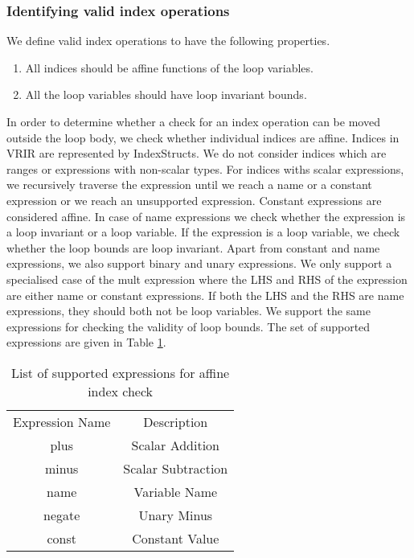 \subsubsection{Identifying valid index operations}
We define valid index operations to have the following properties. 
\begin{enumerate}
\item All indices should be affine functions of the loop variables. 
\item All the loop variables should have loop invariant bounds. 
\end{enumerate}
In order to determine whether a check for an index operation can be moved outside the loop body, we check whether individual indices are affine. Indices in VRIR are represented by IndexStructs. We do not consider indices which are ranges or expressions with non-scalar types. For indices withs scalar expressions, we recursively traverse the expression until we reach a name or a constant expression or we reach an unsupported expression. Constant expressions are considered affine. In  case of name expressions we check whether the expression is a loop invariant or a loop variable. If the expression is a loop variable, we check whether the loop bounds are loop invariant. Apart from constant and name expressions, we also support binary and unary expressions. We only support a specialised case of the mult expression where the LHS and RHS  of the expression are either name or constant expressions. If both the LHS and the RHS are name expressions, they should both not be loop variables. We support the same expressions for checking the validity of loop bounds. The set of supported expressions are given in Table \ref{tab:affineIndexCheck}. 
\begin{table}[htbp]
\centering
\begin{tabular}{|c|c|}
\hline
Expression Name & Description        \\ \hhline{|=|=|}
plus            & Scalar Addition    \\ \hline
minus           & Scalar Subtraction \\ \hline
name            & Variable Name      \\ \hline
negate          & Unary Minus        \\ \hline
const           & Constant Value     \\ \hline
\end{tabular}
\caption{List of supported expressions for affine index check}
\label{tab:affineIndexCheck}
\end{table} 
